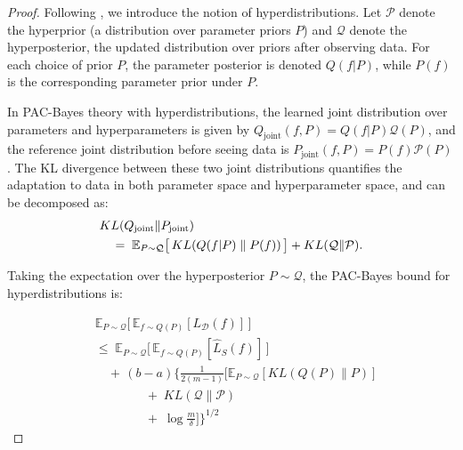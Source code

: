 \documentclass[letterpaper]{article} %
\begin{document}
\begin{proof}
Following \citep{pentinaPACBayesianBoundLifelong2014}, we introduce the notion of hyperdistributions. Let $\mathcal{P}$ denote the hyperprior (a distribution over parameter priors $P$) and $\mathcal{Q}$ denote the hyperposterior, the updated distribution over priors after observing data. For each choice of prior $P$, the parameter posterior is denoted $Q(f|P)$, while $P(f)$ is the corresponding parameter prior under $P$.

In PAC-Bayes theory with hyperdistributions, the learned joint distribution over parameters and hyperparameters is given by $Q_\text{joint}(f, P) = Q(f|P)\mathcal{Q}(P)$, and the reference joint distribution before seeing data is $P_\text{joint}(f, P) = P(f)\mathcal{P}(P)$. The KL divergence between these two joint distributions quantifies the adaptation to data in both parameter space and hyperparameter space, and can be decomposed as:
\begin{align}
& KL(Q_\text{joint} \| P_\text{joint}) \notag\\
&\quad =\; 
\mathbb{E}_{P \sim \mathcal{Q}} \big[\, KL(Q(f|P)\;\|\;P(f))\, \big] 
+ KL(\mathcal{Q} \| \mathcal{P}).
\end{align}




Taking the expectation over the hyperposterior $P \sim \mathcal{Q}$, the PAC-Bayes bound for hyperdistributions is:



\begin{equation}
\begin{aligned}
    & \mathbb{E}_{P \sim \mathcal{Q}} \Big[\, \mathbb{E}_{f \sim Q(P)} [L_{\mathcal{D}}(f)] \,\Big] \\
    &\leq\; \mathbb{E}_{P \sim \mathcal{Q}} \Big[\, \mathbb{E}_{f \sim Q(P)} [\hat{L}_{S}(f)] \,\Big] \\
    &\quad +\, (b-a)\Bigg\{
        \frac{1}{2(m-1)} \bigg[
            \mathbb{E}_{P \sim \mathcal{Q}}\left[ KL(Q(P)\|P) \right] \\
    &\qquad\qquad
            +\; KL(\mathcal{Q}\|\mathcal{P}) \\
    &\qquad\qquad
            +\; \log \frac{m}{\delta}
        \bigg]
    \Bigg\}^{1/2}
\end{aligned}
\end{equation}



\end{proof}
\end{document}
